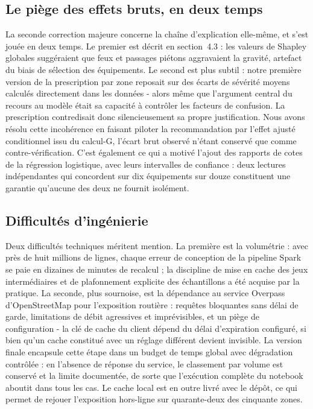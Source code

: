 \documentclass[12pt, a4paper]{article}
\begin{document}
\subsection{Le piège des effets bruts, en deux temps}

La seconde correction majeure concerne la chaîne d'explication elle-même, et s'est jouée en deux temps. Le premier est décrit en section~4.3 : les valeurs de Shapley globales suggéraient que feux et passages piétons aggravaient la gravité, artefact du biais de sélection des équipements. Le second est plus subtil : notre première version de la prescription par zone reposait sur des écarts de sévérité moyens calculés directement dans les données - alors même que l'argument central du recours au modèle était sa capacité à contrôler les facteurs de confusion. La prescription contredisait donc silencieusement sa propre justification. Nous avons résolu cette incohérence en faisant piloter la recommandation par l'effet ajusté conditionnel issu du calcul-G, l'écart brut observé n'étant conservé que comme contre-vérification. C'est également ce qui a motivé l'ajout des rapports de cotes de la régression logistique, avec leurs intervalles de confiance : deux lectures indépendantes qui concordent sur dix équipements sur douze constituent une garantie qu'aucune des deux ne fournit isolément.

\subsection{Difficultés d'ingénierie}

Deux difficultés techniques méritent mention. La première est la volumétrie : avec près de huit millions de lignes, chaque erreur de conception de la pipeline Spark se paie en dizaines de minutes de recalcul ; la discipline de mise en cache des jeux intermédiaires et de plafonnement explicite des échantillons a été acquise par la pratique. La seconde, plus sournoise, est la dépendance au service Overpass d'OpenStreetMap pour l'exposition routière : requêtes bloquantes sans délai de garde, limitations de débit agressives et imprévisibles, et un piège de configuration - la clé de cache du client dépend du délai d'expiration configuré, si bien qu'un cache constitué avec un réglage différent devient invisible. La version finale encapsule cette étape dans un budget de temps global avec dégradation contrôlée : en l'absence de réponse du service, le classement par volume est conservé et la limite documentée, de sorte que l'exécution complète du notebook aboutit dans tous les cas. Le cache local est en outre livré avec le dépôt, ce qui permet de rejouer l'exposition hors-ligne sur quarante-deux des cinquante zones.
\end{document}
